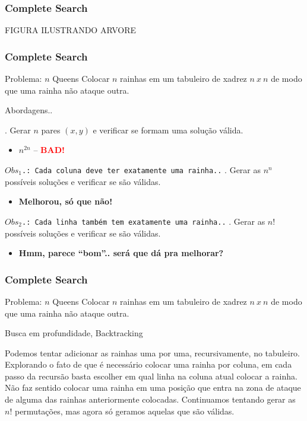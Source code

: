 \begin{frame}
\frametitle{Complete Search}
\huge FIGURA ILUSTRANDO ARVORE
\end{frame}

\begin{frame}
\frametitle{Complete Search}
\begin{block}{Problema: $n$ Queens}
\scriptsize
Colocar $n$ rainhas em um tabuleiro de xadrez $n\ x\ n$ de modo que uma rainha não ataque outra.
\end{block}
\pause
\begin{block}{Abordagens..}
\begin{itemize}[<+->]
	. Gerar $n$ pares $(x,y)$ e verificar se formam uma solução válida.
	\begin{itemize}
		\item[] $n^{2n}$ -- \textbf{\textcolor{red}{BAD!}}
	\end{itemize}
	\bitem \texttt{$Obs_1$.: Cada coluna deve ter exatamente uma rainha..}
	. Gerar as $n^n$ possíveis soluções e verificar se são válidas.
	\begin{itemize}
		\item[] \textbf{Melhorou, só que não!}
	\end{itemize}
	\bitem \texttt{$Obs_2$.: Cada linha também tem exatamente uma rainha..}
	. Gerar as $n!$ possíveis soluções e verificar se são válidas.
	\begin{itemize}
		\item[] \textbf{Hmm, parece ``bom''.. será que dá pra melhorar?}
	\end{itemize}
\end{itemize}
\end{block}
\end{frame}

\begin{frame}
\frametitle{Complete Search}
\begin{block}{Problema: $n$ Queens}
\scriptsize
Colocar $n$ rainhas em um tabuleiro de xadrez $n\ x\ n$ de modo que uma rainha não ataque outra.
\end{block}

\begin{block}{Busca em profundidade, Backtracking}
\begin{itemize}[<+->]
	\bitem Podemos tentar adicionar as rainhas uma por uma, recursivamente, no tabuleiro.
	\bitem Explorando o fato de que é necessário colocar uma rainha por coluna, em cada passo da recursão basta escolher em qual linha na coluna atual colocar a rainha.
	\bitem Não faz sentido colocar uma rainha em uma posição que entra na zona de ataque de alguma das rainhas anteriormente colocadas.
	\bitem Continuamos tentando gerar as $n!$ permutações, mas agora só geramos aquelas que são válidas. \color{ccomments}{(filtrar vs. gerar)}
\end{itemize}
\end{block}
\end{frame}

